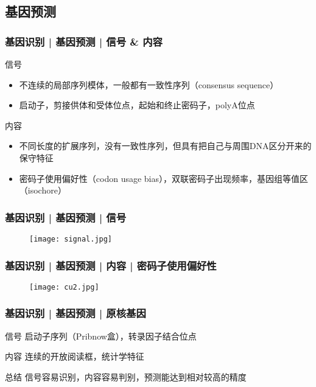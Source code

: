 \documentclass[table]{beamer}
\begin{document}
\subsection{基因预测}
\begin{frame}
  \frametitle{基因识别 | 基因预测 | 信号 \& 内容}
  \begin{block}{信号}
    \begin{itemize}
      \item 不连续的局部序列模体，一般都有一致性序列（consensus sequence）
      \item 启动子，剪接供体和受体位点，起始和终止密码子，polyA位点
    \end{itemize}
  \end{block}
  \pause
  \begin{block}{内容}
    \begin{itemize}
      \item 不同长度的扩展序列，没有一致性序列，但具有把自己与周围DNA区分开来的保守特征
      \item 密码子使用偏好性（codon usage bias），双联密码子出现频率，基因组等值区（isochore）
    \end{itemize}
  \end{block}
\end{frame}

\begin{frame}
  \frametitle{基因识别 | 基因预测 | 信号}
  \begin{figure}
    \centering
    \texttt{[image: signal.jpg]}
  \end{figure}
\end{frame}

\begin{frame}
  \frametitle{基因识别 | 基因预测 | 内容 | 密码子使用偏好性}
  \begin{figure}
    \centering
    \texttt{[image: cu2.jpg]}
  \end{figure}
\end{frame}

\begin{frame}
  \frametitle{基因识别 | 基因预测 | 原核基因}
  \begin{block}{信号}
    启动子序列（Pribnow盒），转录因子结合位点
  \end{block}
  \begin{block}{内容}
    连续的开放阅读框，统计学特征
  \end{block}
  \pause
  \begin{block}{总结}
    信号容易识别，内容容易判别，预测能达到相对较高的精度
  \end{block}
\end{frame}
\end{document}
